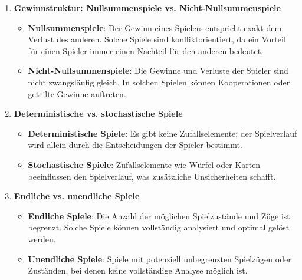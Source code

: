 \begin{enumerate}
	\item \textbf{Gewinnstruktur: Nullsummenspiele vs. Nicht-Nullsummenspiele}
	\begin{itemize}
		\item \textbf{Nullsummenspiele}: Der Gewinn eines Spielers entspricht exakt dem Verlust des anderen. Solche Spiele sind konfliktorientiert, da ein Vorteil für einen Spieler immer einen Nachteil für den anderen bedeutet.
		\item \textbf{Nicht-Nullsummenspiele}: Die Gewinne und Verluste der Spieler sind nicht zwangsläufig gleich. In solchen Spielen können Kooperationen oder geteilte Gewinne auftreten.
	\end{itemize}
	
	\item \textbf{Deterministische vs. stochastische Spiele}
	\begin{itemize}
		\item \textbf{Deterministische Spiele}: Es gibt keine Zufallselemente; der Spielverlauf wird allein durch die Entscheidungen der Spieler bestimmt.
		\item \textbf{Stochastische Spiele}: Zufallselemente wie Würfel oder Karten beeinflussen den Spielverlauf, was zusätzliche Unsicherheiten schafft.
	\end{itemize}
	
	\item \textbf{Endliche vs. unendliche Spiele}
	\begin{itemize}
		\item \textbf{Endliche Spiele}: Die Anzahl der möglichen Spielzustände und Züge ist begrenzt. Solche Spiele können vollständig analysiert und optimal gelöst werden.
		\item \textbf{Unendliche Spiele}: Spiele mit potenziell unbegrenzten Spielzügen oder Zuständen, bei denen keine vollständige Analyse möglich ist.
	\end{itemize}
\end{enumerate}


